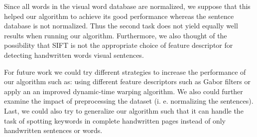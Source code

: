 \documentclass[conference]{IEEEtran}
\begin{document}
Since all words in the visual word database are normalized, we suppose that this helped our algorithm to achieve its good performance whereas the sentence database is not normalized. Thus the second task does not yield equally well results when running our algorithm. Furthermore, we also thought of the possibility that SIFT is not the appropriate choice of feature descriptor for detecting handwritten words visual sentences. 

For future work we could try different strategies to increase the performance of our algorithm such as: using different feature descriptors such as Gabor filters or apply an an improved dynamic-time warping algorithm. 
We also could further examine the impact of preprocessing the dataset (i. e. normalizing the sentences). 
Last, we could also try to generalize our algorithm such that it can handle the task of spotting keywords in complete handwritten pages instead of only handwritten sentences or words.

%
%



%
%
\end{document}
